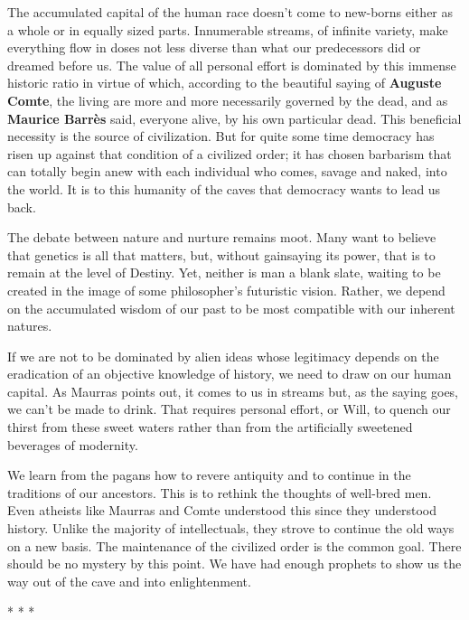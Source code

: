 \begin{quotex}
The accumulated capital of the human race doesn't come to new-borns either as a whole or in equally sized parts. Innumerable streams, of infinite variety, make everything flow in doses not less diverse than what our predecessors did or dreamed before us. The value of all personal effort is dominated by this immense historic ratio in virtue of which, according to the beautiful saying of \textbf{Auguste Comte}, the living are more and more necessarily governed by the dead, and as \textbf{Maurice Barrès} said, everyone alive, by his own particular dead. This beneficial necessity is the source of civilization. But for quite some time democracy has risen up against that condition of a civilized order; it has chosen barbarism that can totally begin anew with each individual who comes, savage and naked, into the world. It is to this humanity of the caves that democracy wants to lead us back.
\end{quotex}


The debate between nature and nurture remains moot. Many want to believe that genetics is all that matters, but, without gainsaying its power, that is to remain at the level of Destiny. Yet, neither is man a blank slate, waiting to be created in the image of some philosopher's futuristic vision. Rather, we depend on the accumulated wisdom of our past to be most compatible with our inherent natures.

If we are not to be dominated by alien ideas whose legitimacy depends on the eradication of an objective knowledge of history, we need to draw on our human capital. As Maurras points out, it comes to us in streams but, as the saying goes, we can't be made to drink. That requires personal effort, or Will, to quench our thirst from these sweet waters rather than from the artificially sweetened beverages of modernity.

We learn from the pagans how to revere antiquity and to continue in the traditions of our ancestors. This is to rethink the thoughts of well-bred men. Even atheists like Maurras and Comte understood this since they understood history. Unlike the majority of intellectuals, they strove to continue the old ways on a new basis. The maintenance of the civilized order is the common goal. There should be no mystery by this point. We have had enough prophets to show us the way out of the cave and into enlightenment.



\begin{center}* * *\end{center}

